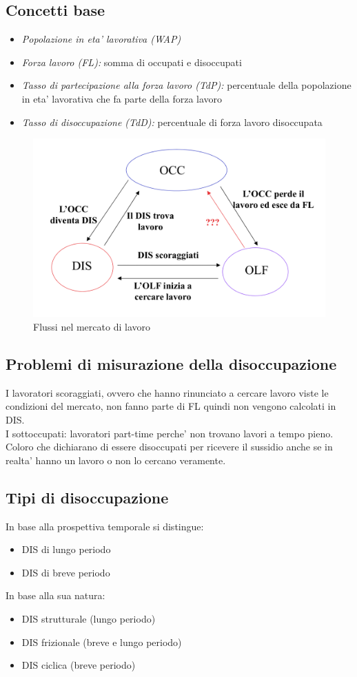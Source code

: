 \documentclass{report}
\begin{document}
	\subsection{Concetti base}
	\begin{itemize}
		\item \textit{Popolazione in eta' lavorativa (WAP)}
		\item \textit{Forza lavoro (FL):} somma di occupati e disoccupati
		\item \textit{Tasso di partecipazione alla forza lavoro (TdP):} percentuale della popolazione in eta' lavorativa che fa parte della forza lavoro
		\item \textit{Tasso di disoccupazione (TdD):} percentuale di forza lavoro disoccupata
	\end{itemize}
	\begin{figure}[h]
		\centering
		\includegraphics[width=0.7\linewidth]{flussi-mercato-lavoro}
		\caption{Flussi nel mercato di lavoro}
		\label{fig:flussi-mercato-lavoro}
	\end{figure}
	\subsection{Problemi di misurazione della disoccupazione}
	I lavoratori scoraggiati, ovvero che hanno rinunciato a cercare lavoro viste le condizioni del mercato, non fanno parte di FL quindi non vengono calcolati in DIS.
	\medskip \\I sottoccupati: lavoratori part-time perche' non trovano lavori a tempo pieno.
	\medskip \\Coloro che dichiarano di essere disoccupati per ricevere il sussidio anche se in realta' hanno un lavoro o non lo cercano veramente.
	\subsection{Tipi di disoccupazione}
	In base alla prospettiva temporale si distingue:
	\begin{itemize}
		\item DIS di lungo periodo
		\item DIS di breve periodo
	\end{itemize}
	In base alla sua natura:
	\begin{itemize}
		\item DIS strutturale (lungo periodo)
		\item DIS frizionale (breve e lungo periodo)
		\item DIS ciclica (breve periodo)
	\end{itemize}
\end{document}
